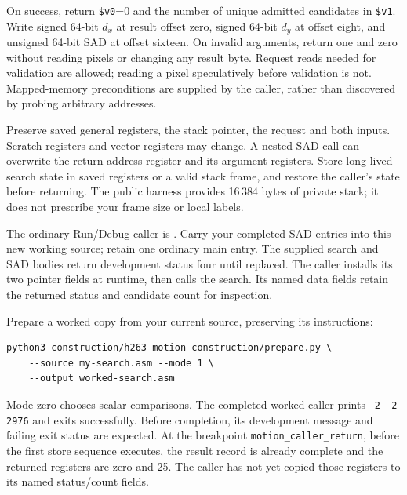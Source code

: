 On success, return \texttt{\$v0}=0 and the number of unique admitted candidates
in \texttt{\$v1}. Write signed 64-bit $d_x$ at result offset zero, signed
64-bit $d_y$ at offset eight, and unsigned 64-bit SAD at offset sixteen.
On invalid arguments, return one and zero without reading pixels or changing
any result byte. Request reads needed for validation are allowed; reading a
pixel speculatively before validation is not. Mapped-memory preconditions are
supplied by the caller, rather than discovered by probing arbitrary addresses.

Preserve saved general registers, the stack pointer, the request and both
inputs. Scratch registers and vector registers may change. A nested SAD call
can overwrite the return-address register and its argument registers. Store
long-lived search state in saved registers or a valid stack frame, and restore
the caller's state before returning. The public harness provides 16\,384 bytes
of private stack; it does not prescribe your frame size or local labels.

The ordinary Run/Debug caller is
. Carry your completed SAD entries
into this new working source; retain one ordinary main entry. The supplied search
and SAD bodies return development status four until replaced. The caller installs
its two pointer fields at runtime, then calls the search. Its named data fields
retain the returned status and candidate count for inspection.

Prepare a worked copy from your current source, preserving its instructions:
\begin{verbatim}
python3 construction/h263-motion-construction/prepare.py \
    --source my-search.asm --mode 1 \
    --output worked-search.asm
\end{verbatim}
Mode zero chooses scalar comparisons. The completed worked caller prints
\texttt{-2 -2 2976} and exits successfully. Before completion, its development
message and failing exit status are expected. At the breakpoint
\texttt{motion\_caller\_return}, before the first store sequence executes, the
result record is already complete and the returned registers are zero and 25.
The caller has not yet copied those registers to its named status/count fields.

